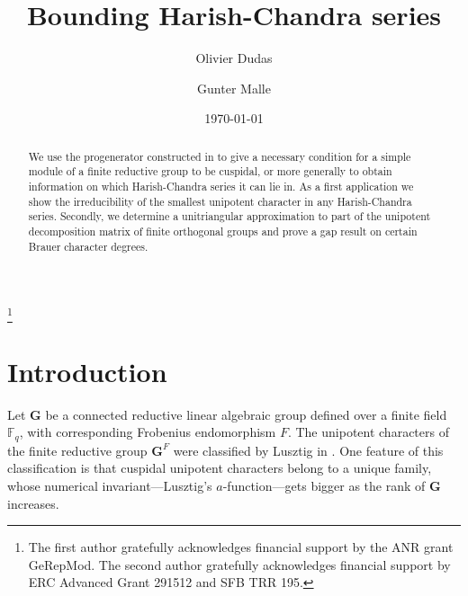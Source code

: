 \documentclass[12pt,leqno,a4paper]{amsart}
\newcommand{\FF}{{\mathbb{F}}}
\newcommand{\bG}{{\mathbf{G}}}
\theoremstyle{remark}
\begin{document}
\title[Bounding Harish-Chandra series]{Bounding Harish-Chandra series}

\date{\today}

\author{Olivier Dudas}
\address{Universit\'e Paris Diderot, UFR de Math\'ematiques,
B\^atiment Sophie Germain, 5 rue Thomas Mann, 75205 Paris CEDEX 13, France.}

\author{Gunter Malle}
\address{FB Mathematik, TU Kaiserslautern, Postfach 3049,
         67653 Kaisers\-lautern, Germany.}

\thanks{The first author gratefully acknowledges financial support by
the ANR grant GeRepMod.
The second author gratefully acknowledges financial support by ERC
  Advanced Grant 291512 and SFB TRR 195.}

\keywords{}


\begin{abstract}
We use the progenerator constructed in \cite{DM17} to give a necessary
condition for a simple module of a finite reductive group to be cuspidal, or
more generally to obtain information on which Harish-Chandra series it can
lie in. As a first application we show the irreducibility of the smallest
unipotent character in any Harish-Chandra series. Secondly, we determine a
unitriangular approximation to part of the unipotent decomposition matrix of
finite orthogonal groups and prove a gap result on certain Brauer character
degrees.
\end{abstract}

\maketitle



\section{Introduction} \label{sec:intro}
Let $\bG$ be a connected reductive linear algebraic group defined over a
finite field $\FF_q$, with corresponding Frobenius endomorphism $F$.
The unipotent characters of the finite reductive group $\bG^F$ were
classified by Lusztig in \cite{LuB}. One feature of this classification is that
cuspidal unipotent characters belong to a unique family, whose numerical
invariant---Lusztig's $a$-function---gets bigger as the rank of $\bG$ increases.
\smallskip
\end{document}
